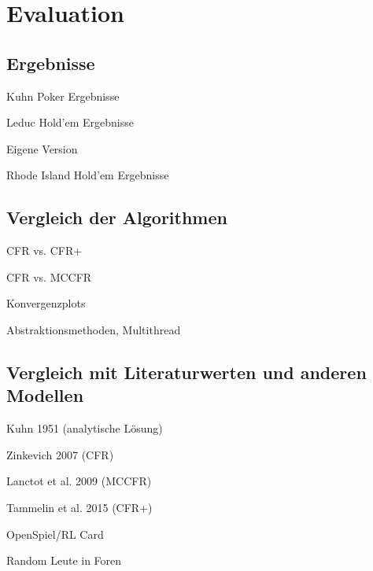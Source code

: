 \chapter{Evaluation}

\section{Ergebnisse}
Kuhn Poker Ergebnisse

Leduc Hold'em Ergebnisse

Eigene Version

Rhode Island Hold'em Ergebnisse

\section{Vergleich der Algorithmen}
CFR vs. CFR+

CFR vs. MCCFR

Konvergenzplots

Abstraktionsmethoden, Multithread

\section{Vergleich mit Literaturwerten und anderen Modellen}
Kuhn 1951 (analytische Lösung)

Zinkevich 2007 (CFR)

Lanctot et al. 2009 (MCCFR)

Tammelin et al. 2015 (CFR+)

OpenSpiel/RL Card

Random Leute in Foren
